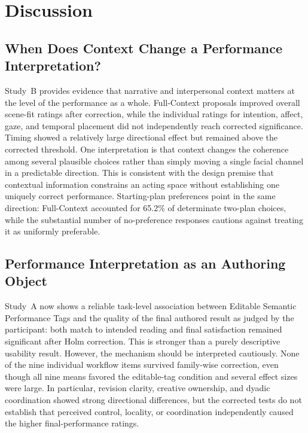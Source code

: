 \section{Discussion}

\subsection{When Does Context Change a Performance Interpretation?}

Study~B provides evidence that narrative and interpersonal context matters at the level of the performance as a whole. Full-Context proposals improved overall scene-fit ratings after correction, while the individual ratings for intention, affect, gaze, and temporal placement did not independently reach corrected significance. Timing showed a relatively large directional effect but remained above the corrected threshold. One interpretation is that context changes the coherence among several plausible choices rather than simply moving a single facial channel in a predictable direction. This is consistent with the design premise that contextual information constrains an acting space without establishing one uniquely correct performance. Starting-plan preferences point in the same direction: Full-Context accounted for 65.2\% of determinate two-plan choices, while the substantial number of no-preference responses cautions against treating it as uniformly preferable.

\subsection{Performance Interpretation as an Authoring Object}

Study~A now shows a reliable task-level association between Editable Semantic Performance Tags and the quality of the final authored result as judged by the participant: both match to intended reading and final satisfaction remained significant after Holm correction. This is stronger than a purely descriptive usability result. However, the mechanism should be interpreted cautiously. None of the nine individual workflow items survived family-wise correction, even though all nine means favored the editable-tag condition and several effect sizes were large. In particular, revision clarity, creative ownership, and dyadic coordination showed strong directional differences, but the corrected tests do not establish that perceived control, locality, or coordination independently caused the higher final-performance ratings.


